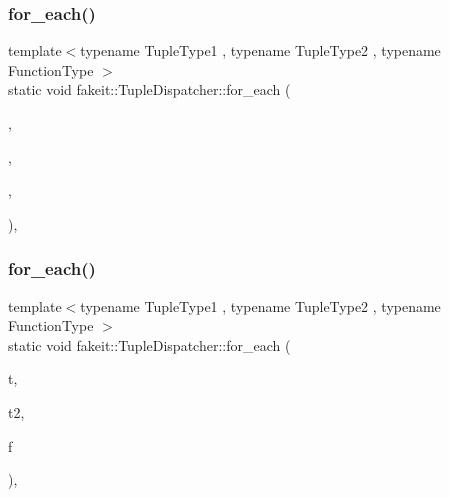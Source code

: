 \mbox{\label{structfakeit_1_1TupleDispatcher_a30fb1a59df83f4faaa461d3fee4b20bc}} 
\subsubsection{\texorpdfstring{for\_each()}{for\_each()}\hspace{0.1cm}{\footnotesize\ttfamily [20/54]}}
{\footnotesize\ttfamily template$<$typename Tuple\+Type1 , typename Tuple\+Type2 , typename Function\+Type $>$ \\
static void fakeit\+::\+Tuple\+Dispatcher\+::for\+\_\+each (\begin{DoxyParamCaption}\item[{Tuple\+Type1 \&\&}]{,  }\item[{Tuple\+Type2 \&\&}]{,  }\item[{Function\+Type \&}]{,  }\item[{std\+::integral\+\_\+constant$<$ size\+\_\+t, std\+::tuple\+\_\+size$<$ typename std\+::remove\+\_\+reference$<$ Tuple\+Type1 $>$\+::type $>$\+::value $>$}]{ }\end{DoxyParamCaption})\hspace{0.3cm}{\ttfamily [inline]}, {\ttfamily [static]}}

\mbox{\label{structfakeit_1_1TupleDispatcher_a1ddb90f24aa73dd61bf2b95c5f176cd5}} 
\subsubsection{\texorpdfstring{for\_each()}{for\_each()}\hspace{0.1cm}{\footnotesize\ttfamily [21/54]}}
{\footnotesize\ttfamily template$<$typename Tuple\+Type1 , typename Tuple\+Type2 , typename Function\+Type $>$ \\
static void fakeit\+::\+Tuple\+Dispatcher\+::for\+\_\+each (\begin{DoxyParamCaption}\item[{Tuple\+Type1 \&\&}]{t,  }\item[{Tuple\+Type2 \&\&}]{t2,  }\item[{Function\+Type \&}]{f }\end{DoxyParamCaption})\hspace{0.3cm}{\ttfamily [inline]}, {\ttfamily [static]}}

